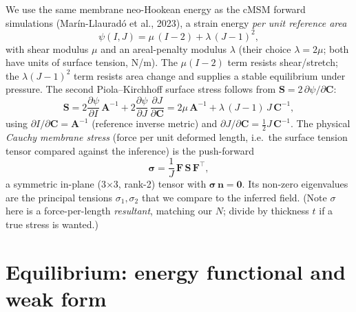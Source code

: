 \documentclass[11pt]{article}
\newcommand{\vv}[1]{\bm{#1}}          %
\newcommand{\nn}{\vv{n}}               %
\newcommand{\FF}{\vv{F}}               %
\newcommand{\CC}{\vv{C}}               %
\newcommand{\Spk}{\vv{S}}               %
\newcommand{\sg}{\vv{\sigma}}          %
\begin{document}
We use the same membrane neo-Hookean energy as the cMSM forward simulations
(Mar\'in-Llaurad\'o et al., 2023), a strain energy \emph{per unit reference area}
\begin{equation}
  \psi(I,J)=\mu\,(I-2)+\lambda\,(J-1)^2,
  \label{eq:psi}
\end{equation}
with shear modulus $\mu$ and an areal-penalty modulus $\lambda$ (their choice
$\lambda=2\mu$; both have units of surface tension, N/m). The $\mu(I-2)$ term resists
shear/stretch; the $\lambda(J-1)^2$ term resists area change and supplies a stable
equilibrium under pressure. The second Piola--Kirchhoff surface stress follows from
$\Spk=2\,\partial\psi/\partial\CC$:
\begin{equation}
  \Spk
  =2\frac{\partial\psi}{\partial I}\,\vv A^{-1}
  +2\frac{\partial\psi}{\partial J}\,\frac{\partial J}{\partial\CC}
  =2\mu\,\vv A^{-1}
  +\lambda\,(J-1)\,J\,\CC^{-1},
  \label{eq:S}
\end{equation}
using $\partial I/\partial\CC=\vv A^{-1}$ (reference inverse metric) and
$\partial J/\partial\CC=\tfrac12 J\,\CC^{-1}$. The physical \emph{Cauchy membrane
stress} (force per unit deformed length, i.e.\ the surface tension tensor compared
against the inference) is the push-forward
\begin{equation}
  \sg=\frac{1}{J}\,\FF\,\Spk\,\FF^{\!\top},
  \label{eq:cauchy}
\end{equation}
a symmetric in-plane (3$\times$3, rank-2) tensor with $\sg\,\nn=\vv0$. Its non-zero
eigenvalues are the principal tensions $\sigma_1,\sigma_2$ that we compare to the
inferred field. (Note $\sigma$ here is a force-per-length \emph{resultant}, matching our
$N$; divide by thickness $t$ if a true stress is wanted.)

\section{Equilibrium: energy functional and weak form}
\label{sec:equil}
\end{document}
